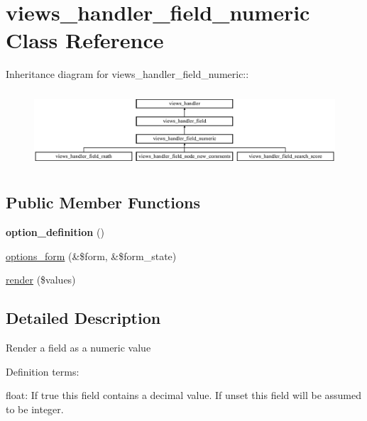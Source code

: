 \hypertarget{classviews__handler__field__numeric}{
\section{views\_\-handler\_\-field\_\-numeric Class Reference}
\label{classviews__handler__field__numeric}
}
Inheritance diagram for views\_\-handler\_\-field\_\-numeric::\begin{figure}[H]
\begin{center}
\leavevmode
\includegraphics[height=2.87179cm]{classviews__handler__field__numeric}
\end{center}
\end{figure}
\subsection*{Public Member Functions}
\begin{DoxyCompactItemize}
\item 
\hypertarget{classviews__handler__field__numeric_aab74a55c8b3c564ee995e210a503947b}{
{\bfseries option\_\-definition} ()}
\label{classviews__handler__field__numeric_aab74a55c8b3c564ee995e210a503947b}

\item 
\hyperlink{classviews__handler__field__numeric_ae6f81d1896ece64e9450ebc2d60da2fd}{options\_\-form} (\&\$form, \&\$form\_\-state)
\item 
\hyperlink{classviews__handler__field__numeric_a9c76aeef951c45385fd91a22e5e656aa}{render} (\$values)
\end{DoxyCompactItemize}


\subsection{Detailed Description}
Render a field as a numeric value

Definition terms:
\begin{DoxyItemize}
\item float: If true this field contains a decimal value. If unset this field will be assumed to be integer. 
\end{DoxyItemize}

